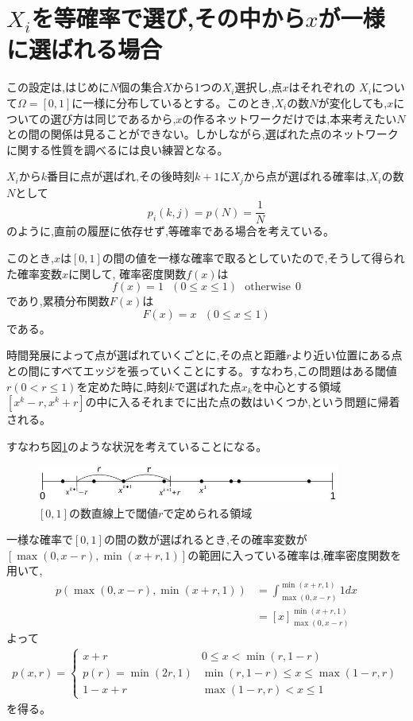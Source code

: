 \section{$X_{i}$を等確率で選び,その中から$x$が一様に選ばれる場合}

この設定は,はじめに$N$個の集合$X$から1つの$X_{i}$選択し,点$x$はそれぞれの $X_{i}$について$\Omega = [0,1]$に一様に分布しているとする。このとき,$X_{i}$の数$N$が変化しても,$x$についての選び方は同じであるから,$x$の作るネットワークだけでは,本来考えたい$N$との間の関係は見ることができない。しかしながら,選ばれた点のネットワークに関する性質を調べるには良い練習となる。

$X_{i}$から$k$番目に点が選ばれ,その後時刻$k+1$に$X_{j}$から点が選ばれる確率は,$X_{i}$の数$N$として
\[p_{i}(k,j) = p(N) = \frac{1}{N}\]
のように,直前の履歴に依存せず,等確率である場合を考えている。

このとき,$x$は$[0,1]$の間の値を一様な確率で取るとしていたので,そうして得られた確率変数$x$に関して,
確率密度関数$f(x)$は
\[f(x) = 1\ \ \ (0\le x \le 1)\ \ \ \text{otherwise}\ \ 0\]
であり,累積分布関数$F(x)$は
\[F(x) = x\ \ \ (0\le x \le 1)\]
である。

時間発展によって点が選ばれていくごとに,その点と距離$r$より近い位置にある点との間にすべてエッジを張っていくことにする。すなわち,この問題はある閾値$r(0<r\le1)$を定めた時に,時刻$k$で選ばれた点$x_{k}$を中心とする領域$[x^{k}-r, x^{k}+r]$の中に入るそれまでに出た点の数はいくつか,という問題に帰着される。

すなわち図\ref{fig:f2}のような状況を考えていることになる。
\begin{figure}[H]
    \begin{center}
        \includegraphics[width=10cm]{../simple1/simple001_1.jpg}
        \caption{$[0,1]$の数直線上で閾値$r$で定められる領域}
        \label{fig:f2}
    \end{center}
\end{figure}

一様な確率で$[0,1]$の間の数が選ばれるとき,その確率変数が$[\max(0,x-r), \min(x+r,1)]$の範囲に入っている確率は,確率密度関数を用いて,
\begin{align}
p(\max(0, x-r), \min(x+r, 1)) &= \int ^{\min(x+r,1)}_{\max(0, x-r)} 1 dx \nonumber \\
&= \left[ x\right]^{\min(x+r,1)}_{\max(0, x-r)}
\end{align}
よって
\begin{eqnarray}
p(x,r)= \left\{ \begin{array}{ll}x+r & 0\le x< \min(r,1-r) \nonumber \\
p(r) = \min(2r, 1) & \min(r, 1-r)\le x \le \max(1-r, r) \nonumber \\
1 - x+r & \max(1-r, r) < x \le 1
\end{array}\right.
\end{eqnarray}
を得る。


